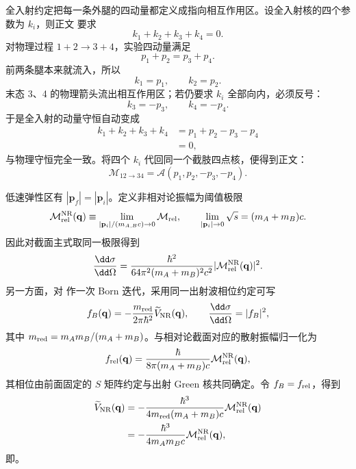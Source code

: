 \begin{derivation}[全入射振幅与物理散射通道]
全入射约定把每一条外腿的四动量都定义成指向相互作用区。设全入射核的四个参数为 $k_i$，则正文 要求
\[
k_1+k_2+k_3+k_4=0.
\]
对物理过程 $1+2\to3+4$，实验四动量满足
\[
p_1+p_2=p_3+p_4.
\]
前两条腿本来就流入，所以
\[
k_1=p_1,\qquad k_2=p_2.
\]
末态 3、4 的物理箭头流出相互作用区；若仍要求 $k_i$ 全部向内，必须反号：
\[
k_3=-p_3,\qquad k_4=-p_4.
\]
于是全入射的动量守恒自动变成
\begin{align*}
k_1+k_2+k_3+k_4
&=p_1+p_2-p_3-p_4\\
&=0,
\end{align*}
与物理守恒完全一致。将四个 $k_i$ 代回同一个截肢四点核，便得到正文：
\[
\mathcal M_{12\to34}
=\mathcal A(p_1,p_2,-p_3,-p_4).
\]
\end{derivation}



\begin{derivation}[低速散射振幅与势能的匹配]
低速弹性区有 $|\mathbf p_f|=|\mathbf p_i|$。定义非相对论振幅为阈值极限
\begin{equation*}
\mathcal M_{\rm rel}^{\rm NR}(\mathbf q)
\equiv\lim_{|\mathbf p_i|/(m_{A,B}c)\to0}\mathcal M_{\rm rel},
\qquad
\lim_{|\mathbf p_i|\to0}\sqrt{s}=(m_A+m_B)c.
\end{equation*}
因此对截面主式取同一极限得到
\begin{equation*}
 \frac{\dd\sigma}{\dd\Omega}
 =\frac{\hbar^2}{64\pi^2(m_A+m_B)^2c^2}
 |\mathcal M_{\rm rel}^{\rm NR}(\mathbf q)|^2.
\end{equation*}
另一方面，对 作一次 Born 迭代，采用同一出射波相位约定可写
\begin{equation*}
 f_B(\mathbf q)
 =-\frac{m_{\rm red}}{2\pi\hbar^2}
 \widetilde V_{\rm NR}(\mathbf q),
 \qquad
 \frac{\dd\sigma}{\dd\Omega}=|f_B|^2,
\end{equation*}
其中 $m_{\rm red}=m_Am_B/(m_A+m_B)$。与相对论截面对应的散射振幅归一化为
\begin{equation*}
 f_{\rm rel}(\mathbf q)
 =\frac{\hbar}{8\pi(m_A+m_B)c}
 \mathcal M_{\rm rel}^{\rm NR}(\mathbf q),
\end{equation*}
其相位由前面固定的 $S$ 矩阵约定与出射 Green 核共同确定。令 $f_B=f_{\rm rel}$，得到
\begin{align*}
 \widetilde V_{\rm NR}(\mathbf q)
 &=-\frac{\hbar^3}{4m_{\rm red}(m_A+m_B)c}
 \mathcal M_{\rm rel}^{\rm NR}(\mathbf q)\\
 &=-\frac{\hbar^3}{4m_Am_Bc}
 \mathcal M_{\rm rel}^{\rm NR}(\mathbf q),
\end{align*}
即。
\end{derivation}

